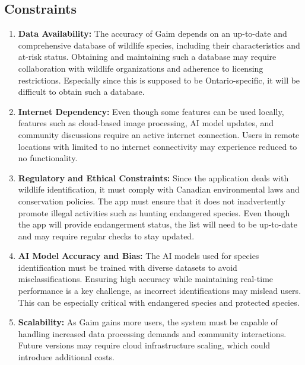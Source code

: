 \documentclass[]{article}
\begin{document}
\subsection{Constraints}
\label{sub:constraints}
\begin{enumerate}
    \item \textbf{Data Availability:} The accuracy of Gaim depends on an up-to-date and comprehensive database of wildlife species, including their characteristics and at-risk status. Obtaining and maintaining such a database may require collaboration with wildlife organizations and adherence to licensing restrictions. Especially since this is supposed to be Ontario-specific, it will be difficult to obtain such a database.

    \item \textbf{Internet Dependency:} Even though some features can be used locally, features such as cloud-based image processing, AI model updates, and community discussions require an active internet connection. Users in remote locations with limited to no internet connectivity may experience reduced to no functionality.

    \item \textbf{Regulatory and Ethical Constraints:} Since the application deals with wildlife identification, it must comply with Canadian environmental laws and conservation policies. The app must ensure that it does not inadvertently promote illegal activities such as hunting endangered species. Even though the app will provide endangerment status, the list will need to be up-to-date and may require regular checks to stay updated.

    \item \textbf{AI Model Accuracy and Bias:} The AI models used for species identification must be trained with diverse datasets to avoid misclassifications. Ensuring high accuracy while maintaining real-time performance is a key challenge, as incorrect identifications may mislead users. This can be especially critical with endangered species and protected species.

    \item \textbf{Scalability:} As Gaim gains more users, the system must be capable of handling increased data processing demands and community interactions. Future versions may require cloud infrastructure scaling, which could introduce additional costs. 
\end{enumerate}
\end{document}
